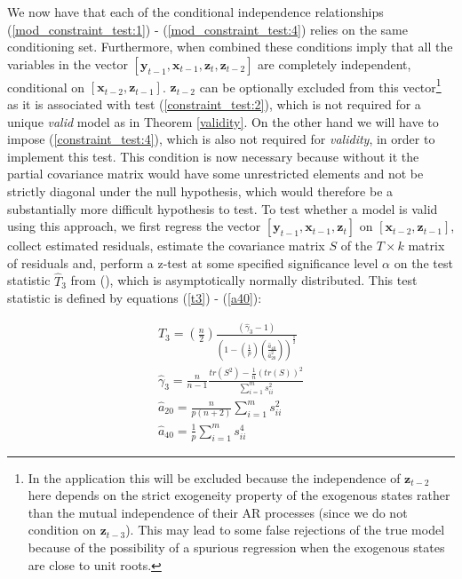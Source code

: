 \documentclass{article}
\begin{document}
We now have that each of the conditional independence relationships (\ref{mod_constraint_test:1}) - (\ref{mod_constraint_test:4}) relies on the same conditioning set. Furthermore, when combined these conditions imply that all the variables in the vector $[\mathbf{y}_{t-1}, \mathbf{x}_{t-1}, \mathbf{z}_{t}, \mathbf{z}_{t-2}]$ are completely independent, conditional on $[\mathbf{x}_{t-2}, \mathbf{z}_{t-1}]$. $\mathbf{z}_{t-2}$ can be optionally excluded from this vector\footnote{In the application this will be excluded because the independence of $\mathbf{z}_{t-2}$ here depends on the strict exogeneity property of the exogenous states rather than the mutual independence of their AR processes (since we do not condition on $\mathbf{z}_{t-3}$). This may lead to some false rejections of the true model because of the possibility of a spurious regression when the exogenous states are close to unit roots.} as it is associated with test (\ref{constraint_test:2}), which is not required for a unique \textit{valid} model as in Theorem \ref{validity}. On the other hand we will have to impose (\ref{constraint_test:4}), which is also not required for \textit{validity}, in order to implement this test. This condition is now necessary because without it the partial covariance matrix would have some unrestricted elements and not be strictly diagonal under the null hypothesis, which would therefore be a substantially more difficult hypothesis to test. To test whether a model is valid using this approach, we first regress the vector $[\mathbf{y}_{t-1}, \mathbf{x}_{t-1}, \mathbf{z}_{t}]$ on $[\mathbf{x}_{t-2}, \mathbf{z}_{t-1}]$, collect estimated residuals, estimate the covariance matrix $S$ of the $T \times k$ matrix of residuals and, perform a z-test at some specified significance level $\alpha$ on the test statistic $\hat{T}_3$ from \citeauthor{srivastava2005some} (\citeyear{srivastava2005some}), which is asymptotically normally distributed. This test statistic is defined by equations (\ref{t3}) - (\ref{a40}):

\begin{align}
  \hat{T}_3 = \left(\frac{n}2{}\right)\frac{(\hat{\gamma}_3-1)}{\left(1-\left(\frac{1}{p}\right)\left(\frac{\hat{a}_{40}}{\hat{a}^2_{20}}\right)\right)^\frac{1}{2}} \label{t3} \\
  \hat{\gamma}_3 = \frac{n}{n-1}\frac{tr(S^2) - \frac{1}{n}(tr(S))^2}{\sum_{i=1}^ms^2_{ii}} \\
  \hat{a}_{20} = \frac{n}{p(n+2)}\sum_{i=1}^ms^2_{ii} \\
  \hat{a}_{40} = \frac{1}{p}\sum_{i=1}^ms^4_{ii} \label{a40}
\end{align}
\end{document}
